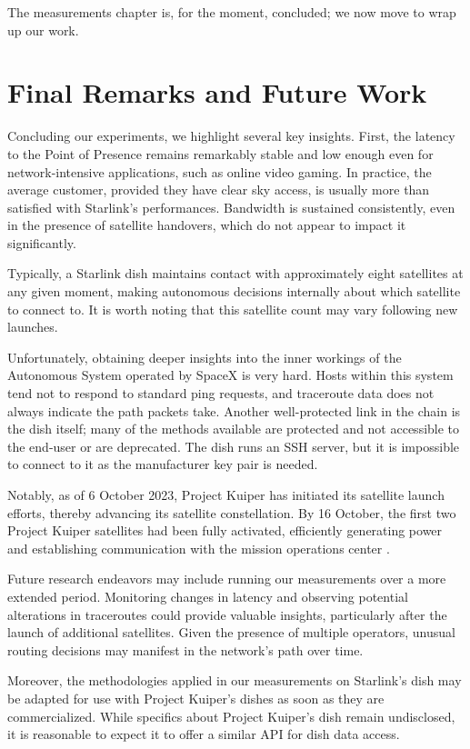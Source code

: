 \documentclass[IN,11pt,twoside,openright,idp,english]{tumthesis}
\begin{document}
The measurements chapter is, for the moment, concluded; we now move to wrap up our work.


\chapter{Final Remarks and Future Work}

Concluding our experiments, we highlight several key insights. First, the latency to the Point of Presence remains
remarkably stable and low enough even for network-intensive applications, such as online video gaming. In practice, the
average customer, provided they have clear sky access, is usually more than satisfied with Starlink's performances.
Bandwidth is sustained consistently, even in the presence of satellite handovers, which do not appear to impact it
significantly.

Typically, a Starlink dish maintains contact with approximately eight satellites at any given moment, making autonomous
decisions internally about which satellite to connect to. It is worth noting that this satellite count may vary
following new launches.

Unfortunately, obtaining deeper insights into the inner workings of the Autonomous System operated by SpaceX is very
hard. Hosts within this system tend not to respond to standard ping requests, and traceroute data does not always
indicate the path packets take. Another well-protected link in the chain is the dish itself; many of the methods
available are protected and not accessible to the end-user or are deprecated. The dish runs an SSH server, but it is
impossible to connect to it as the manufacturer key pair is needed.

Notably, as of 6 October 2023, Project Kuiper has initiated its satellite launch efforts, thereby advancing its
satellite constellation. By 16 October, the first two Project Kuiper satellites had been fully activated, efficiently
generating power and establishing communication with the mission operations center \cite{kuiplaunches}.

Future research endeavors may include running our measurements over a more extended period. Monitoring changes in
latency and observing potential alterations in traceroutes could provide valuable insights, particularly after the
launch of additional satellites. Given the presence of multiple operators, unusual routing decisions may manifest in the
network's path over time.

Moreover, the methodologies applied in our measurements on Starlink's dish may be adapted for use with Project Kuiper's
dishes as soon as they are commercialized. While specifics about Project Kuiper's dish remain undisclosed, it is
reasonable to expect it to offer a similar API for dish data access.
\end{document}
